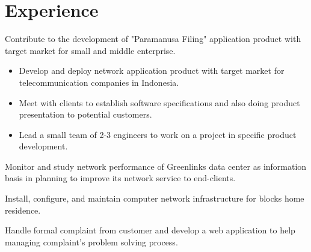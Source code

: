 \documentclass[10pt, a4paper]{moderncv}
\begin{document}
\section{Experience}
{ 
    \begin{scriptsize} 
    Contribute to the development of "Paramanusa Filing" application product with target market
    for small and middle enterprise.\\
    \end{scriptsize}
}
{ 
    \begin{itemize} 
    \item Develop and deploy network application product with target market for telecommunication companies in Indonesia.
    \item Meet with clients to establish software specifications and also doing product presentation to potential customers.
    \item Lead a small team of 2-3 engineers to work on a project in specific product development.\\
    \end{itemize}
}
{
    \begin{scriptsize}
    Monitor and study network performance of Greenlinks data center as information
    basis in planning to improve its network service to end-clients.\\
    \end{scriptsize}
}
{
    \begin{scriptsize}
    Install, configure, and maintain computer network infrastructure for blocks home residence.\\
    \end{scriptsize}
}
{
    \begin{scriptsize}
    Handle formal complaint from customer and develop a web application to help managing
    complaint's problem solving process.\\
    \end{scriptsize}
}
\\
\end{document}
